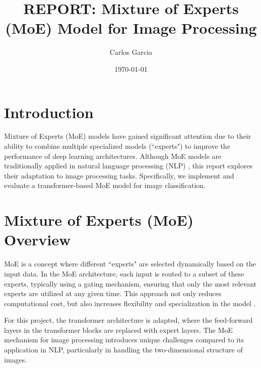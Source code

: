 \documentclass[a4paper,11pt]{article}
\title{REPORT: Mixture of Experts (MoE) Model for Image Processing}
\author{Carlos Garcia}
\date{\today}
\begin{document}
\maketitle

\section{Introduction}
Mixture of Experts (MoE) models have gained significant attention due to their ability to combine multiple specialized models (``experts") to improve the performance of deep learning architectures. Although MoE models are traditionally applied in natural language processing (NLP) \cite{shazeer2017outrageously}, this report explores their adaptation to image processing tasks. Specifically, we implement and evaluate a transformer-based MoE model for image classification.

\section{Mixture of Experts (MoE) Overview}
MoE is a concept where different ``experts" are selected dynamically based on the input data. In the MoE architecture, each input is routed to a subset of these experts, typically using a gating mechanism, ensuring that only the most relevant experts are utilized at any given time. This approach not only reduces computational cost, but also increases flexibility and specialization in the model \cite{huggingfaceMixtureExperts}.

For this project, the transformer architecture \cite{vaswani2017attention} is adapted, where the feed-forward layers in the transformer blocks are replaced with expert layers. The MoE mechanism for image processing introduces unique challenges compared to its application in NLP, particularly in handling the two-dimensional structure of images.
\end{document}
